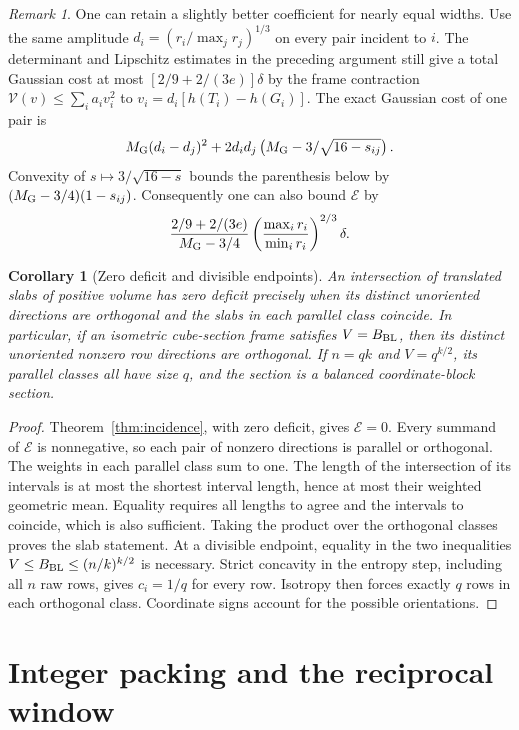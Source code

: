 \documentclass[11pt,a4paper]{article}
\newtheorem{corollary}[theorem]{Corollary}
\theoremstyle{remark}\newtheorem{remark}[theorem]{Remark}
\numberwithin{equation}{section}
\begin{document}
\begin{remark}
One can retain a slightly better coefficient for nearly equal widths.
Use the same amplitude \(d_i=(r_i/\max_jr_j)^{1/3}\) on every
pair incident to \(i\). The determinant and Lipschitz estimates in
the preceding argument still give a total Gaussian cost at most
\([2/9+2/(3e)]\delta\) by the frame contraction
\(\mathcal V(v)\le\sum_i a_i v_i^2\) to
\(v_i=d_i[h(T_i)-h(G_i)]\). The exact Gaussian cost of one pair is
\[
 M_{\rm G}(d_i-d_j)^2+
 2d_i d_j\left(M_{\rm G}-3/\sqrt{16-s_{ij}}\right).
\]
Convexity of \(s\mapsto3/\sqrt{16-s}\) bounds the parenthesis below by
\((M_{\rm G}-3/4)(1-s_{ij})\). Consequently one can also bound
\(\mathcal E\) by
\[
 \frac{2/9+2/(3e)}{M_{\rm G}-3/4}
 \left(\frac{\max_i r_i}{\min_i r_i}\right)^{2/3}\delta .
\]
\end{remark}
\begin{corollary}[Zero deficit and divisible endpoints]
\label{cor:zero-deficit-rigidity}
An intersection of translated slabs of positive volume has zero deficit precisely when its distinct unoriented directions are orthogonal and the slabs in each parallel class coincide. In particular, if an isometric cube-section frame satisfies $V=B_{\rm BL}$, then
its distinct unoriented nonzero row directions are orthogonal.
If $n=qk$ and $V=q^{k/2}$, its parallel classes all have size $q$,
and the section is a balanced coordinate-block section.
\end{corollary}
\begin{proof}
Theorem~\ref{thm:incidence}, with zero deficit,
gives $\mathcal E=0$. Every summand of $\mathcal E$ is nonnegative,
so each pair of nonzero directions is parallel or orthogonal.
The weights in each parallel class sum to one. The length of the
intersection of its intervals is at most the shortest interval length,
hence at most their weighted geometric mean. Equality requires all
lengths to agree and the intervals to coincide, which is also sufficient.
Taking the product over the orthogonal classes proves the slab statement.
At a divisible endpoint, equality in the two inequalities
$V\le B_{\rm BL}\le(n/k)^{k/2}$ is necessary. Strict concavity in
the entropy step, including all $n$ raw rows, gives $c_i=1/q$ for
every row. Isotropy then forces exactly $q$ rows in each orthogonal
class. Coordinate signs account for the possible orientations.
\end{proof}

\section{Integer packing and the reciprocal window}
\label{sec:integer-packing}
\label{sec:integer-leverage-quantization}
\end{document}

